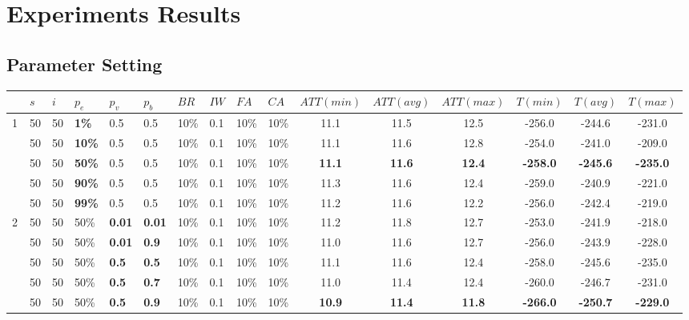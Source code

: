 \chapter{Experiments Results}
\label{appendixC}

\section{Parameter Setting}
\begin{sidewaystable}
    \centering
	\begin{tabular}{|l|l|l|l|l|l|l|l|l|l||c|c|c|c|c|c|}
 	\hline
 	~ & $s$ & $i$ & $p_{e}$ & $p_{v}$ & $p_{b}$ & $BR$ &$IW$ & $FA$ & $CA$ &  $ATT(min)$ & $ATT(avg)$ & $ATT(max)$ & $T(min)$ & $T(avg)$ & $T(max)$\\
 	\hline
    1 & 50 & 50 & \textbf{1\%} & 0.5 & 0.5 & 10\% & 0.1 & 10\% & 10\% & 11.1 & 11.5 & 12.5 & -256.0 &-244.6 & -231.0  \\
    ~ & 50 & 50 & \textbf{10\%} & 0.5 & 0.5 & 10\% & 0.1 & 10\% & 10\% & 11.1 & 11.6 & 12.8 & -254.0 & -241.0 & -209.0 \\
    ~ & 50 & 50 & \textbf{50\%} & 0.5 & 0.5 & 10\% & 0.1 & 10\% & 10\% & \textbf{11.1} & \textbf{11.6} & \textbf{12.4} & \textbf{-258.0} & \textbf{-245.6} & \textbf{-235.0}\\
    ~ & 50 & 50 & \textbf{90\%} & 0.5 & 0.5 & 10\% & 0.1 & 10\% & 10\% &  11.3 & 11.6 & 12.4 & -259.0 & -240.9 & -221.0  \\
    ~ & 50 & 50 & \textbf{99\%} & 0.5 & 0.5 & 10\% & 0.1 & 10\% & 10\% &  11.2 & 11.6 & 12.2 & -256.0 & -242.4 & -219.0  \\
    \hline
    2 & 50 & 50 & 50\% & \textbf{0.01} & \textbf{0.01} & 10\% & 0.1 & 10\% & 10\% & 11.2 & 11.8 & 12.7 & -253.0 & -241.9 & -218.0  \\
    ~ & 50 & 50 & 50\% & \textbf{0.01} & \textbf{0.9} & 10\% & 0.1 & 10\% & 10\% &  11.0 & 11.6 & 12.7 & -256.0 & -243.9 & -228.0  \\
    ~ & 50 & 50 & 50\% & \textbf{0.5} & \textbf{0.5} & 10\% & 0.1 & 10\%& 10\% & 11.1 & 11.6 & 12.4 & -258.0 & -245.6 & -235.0 \\
    ~ & 50 & 50 & 50\% & \textbf{0.5} & \textbf{0.7} & 10\% & 0.1 & 10\% & 10\% &  11.0 & 11.4 & 12.4 & -260.0 & -246.7 & -231.0 \\
    ~ & 50 & 50 & 50\% & \textbf{0.5} & \textbf{0.9} & 10\% & 0.1 & 10\% & 10\% &  \textbf{10.9} & \textbf{11.4} & \textbf{11.8} & \textbf{-266.0} & \textbf{-250.7} & \textbf{-229.0} \\

\end{tabular}
\end{sidewaystable}

